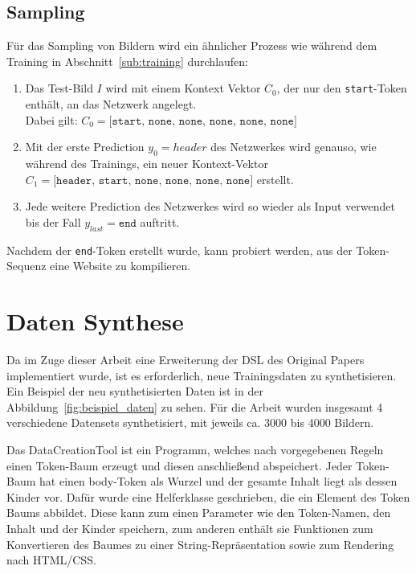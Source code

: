 \documentclass[pdftex,a4paper,halfparskip, article]{scrartcl}
\begin{document}
\subsection{Sampling}\label{sub:sampling}

Für das Sampling von Bildern wird ein ähnlicher Prozess wie während dem Training in Abschnitt~\ref{sub:training} durchlaufen:

\begin{enumerate}
	\item Das Test-Bild $I$ wird mit einem Kontext Vektor $C_0$, der nur den \texttt{start}-Token enthält, an das Netzwerk angelegt. \\ Dabei gilt: $C_0 = \texttt{[start, none, none, none, none, none]}$ 
	\item Mit der erste Prediction $y_0 = header$ des Netzwerkes wird genauso, wie während des Trainings, ein neuer Kontext-Vektor $C_1 = \texttt{[header, start, none, none, none, none]}$ erstellt.
	\item Jede weitere Prediction des Netzwerkes wird so wieder als Input verwendet bis der Fall $y_{last} = \texttt{end}$ auftritt. 
\end{enumerate}

Nachdem der \texttt{end}-Token erstellt wurde, kann probiert werden, aus der Token-Sequenz eine Website zu kompilieren. 

\newpage
\section{Daten Synthese}

Da im Zuge dieser Arbeit eine Erweiterung der DSL des Original Papers implementiert wurde, ist es erforderlich, neue Trainingsdaten zu synthetisieren. Ein Beispiel der neu synthetisierten Daten ist in der Abbildung~\ref{fig:beispiel_daten} zu sehen. Für die Arbeit wurden insgesamt 4 verschiedene Datensets synthetisiert, mit jeweils ca. 3000 bis 4000 Bildern. 

Das DataCreationTool ist ein Programm, welches nach vorgegebenen Regeln einen Token-Baum erzeugt und diesen anschließend abspeichert. Jeder Token-Baum hat einen body-Token als Wurzel und der gesamte Inhalt liegt als dessen Kinder vor. Dafür wurde eine Helferklasse geschrieben, die ein Element des Token Baums abbildet. Diese kann zum einen Parameter wie den Token-Namen, den Inhalt und der Kinder speichern, zum anderen enthält sie Funktionen zum Konvertieren des Baumes zu einer String-Repräsentation sowie zum Rendering nach HTML/CSS. 
\end{document}
